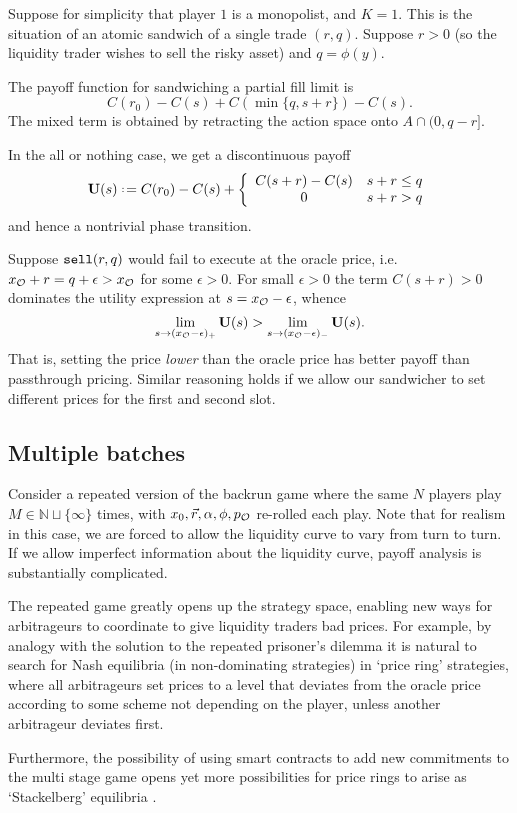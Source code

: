 \begin{example}

  Suppose for simplicity that player $1$ is a monopolist, and $K=1$.
  This is the situation of an atomic sandwich of a single trade $(r,q)$.
  Suppose $r>0$ (so the liquidity trader wishes to sell the risky asset) and $q=\phi(y)$.

  The payoff function for sandwiching a partial fill limit is 
  \[
    C(r_0) - C(s) + C(\min\{q,s+r\}) - C(s).
  \]
  The mixed term is obtained by retracting the action space onto $A\cap(0,q-r]$.

  In the all or nothing case, we get a discontinuous payoff
  \[
    \Utility(s) \defeq C(r_0) - C(s) + \left\{ \begin{array}{cc}C(s+r) - C(s) & s+r\leq q \\ 0 & s+r> q \end{array} \right.
  \]
  and hence a nontrivial phase transition.
  
  Suppose $\mathtt{sell}(r,q)$ would fail to execute at the oracle price, i.e.~$x_{\mathcal{O}} + r = q + \epsilon > x_{\mathcal{O}}$ for some $\epsilon>0$. 
  For small $\epsilon>0$ the term $C(s+r)>0$ dominates the utility expression at $s= x_{\mathcal{O}} -\epsilon$, whence
  \[
    \lim_{s\rightarrow (x_{\mathcal{O}}-\epsilon)_+} \mathbf{U}(s) > \lim_{s\rightarrow (x_{\mathcal{O}}-\epsilon)_-} \mathbf{U}(s).
  \]
  That is, setting the price \emph{lower} than the oracle price has better payoff than passthrough pricing.
  Similar reasoning holds if we allow our sandwicher to set different prices for the first and second slot.

\end{example}

\subsection{Multiple batches} \label{multiple-batches}

Consider a repeated version of the backrun game where the same \(N\) players play \(M\in\mathbb{N}\sqcup\{\infty\}\) times, with \(x_0,\vec{r},\alpha,\phi,p_{\mathcal{O}}\) re-rolled each play.
%
Note that for realism in this case, we are forced to allow the liquidity curve to vary from turn to turn.
%
If we allow imperfect information about the liquidity curve, payoff analysis is substantially complicated.

The repeated game greatly opens up the strategy space, enabling new ways for arbitrageurs to coordinate to give liquidity traders bad prices.
%
For example, by analogy with the solution to the repeated prisoner's dilemma it is natural to search for Nash equilibria (in non-dominating strategies) in `price ring' strategies, where all arbitrageurs set prices to a level that deviates from the oracle price according to some scheme not depending on the player, unless another arbitrageur deviates first.

Furthermore, the possibility of using smart contracts to add new commitments to the multi stage game opens yet more possibilities for price rings to arise as `Stackelberg' equilibria \cite{hall2021game}.


\printbibliography